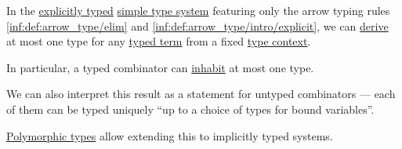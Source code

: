 \begin{proposition}\label{thm:typed_term_habitation_uniqueness}
  In the \hyperref[def:simple_type_system_style]{explicitly typed} \hyperref[def:simple_type_system]{simple type system} featuring only the arrow typing rules \ref{inf:def:arrow_type/elim} and \ref{inf:def:arrow_type/intro/explicit}, we can \hyperref[def:simple_type_derivation]{derive} at most one type for any \hyperref[def:typed_lambda_term]{typed term} from a fixed \hyperref[def:type_context]{type context}.
\end{proposition}
\begin{comments}
  \item In particular, a typed combinator can \hyperref[def:type_habitation]{inhabit} at most one type.

  \item We can also interpret this result as a statement for untyped combinators --- each of them can be typed uniquely \enquote{up to a choice of types for bound variables}.

  \item \hyperref[def:lambda_cube/term_on_type]{Polymorphic types} allow extending this to implicitly typed systems.
\end{comments}
